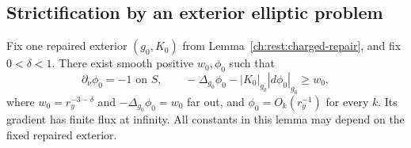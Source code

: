 \subsection{Strictification by an exterior elliptic problem}

\begin{lemma}
\label{ch:rest:strict-direction}
Fix one repaired exterior $(g_0,K_0)$ from
Lemma~\ref{ch:rest:charged-repair}, and fix $0<\delta<1$. There exist
smooth positive $w_0,\phi_0$ such that
\begin{equation}
 \label{ch:rest:strict-direction-equations}
 \partial_\nu\phi_0=-1\text{ on }S,\qquad
 -\Delta_{g_0}\phi_0-|K_0|_{g_0}|d\phi_0|_{g_0}\ge w_0,
\end{equation}
where $w_0=r_y^{-3-\delta}$ and
$-\Delta_{g_0}\phi_0=w_0$ far out, and
$\phi_0=O_k(r_y^{-1})$ for every $k$.
Its gradient has finite flux at infinity. All constants in this lemma
may depend on the fixed repaired exterior.
\end{lemma}
